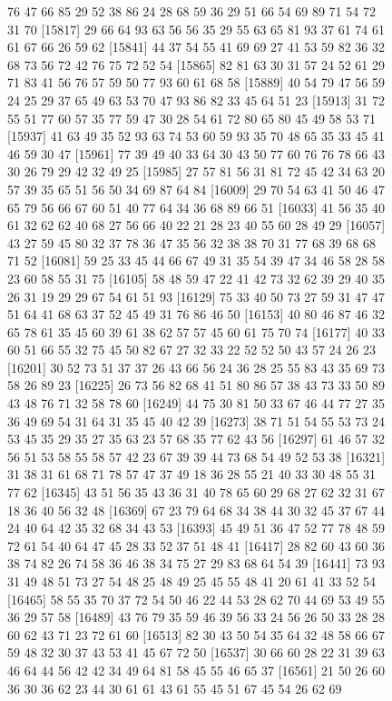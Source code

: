 \documentclass{article}
\begin{document}
\begin{figure}[H]
\begin{Schunk}
\begin{Soutput}
[15793] 76 47 66 85 29 52 38 86 24 28 68 59 36 29 51 66 54 69 89 71 54 72 31 70
[15817] 29 66 64 93 63 56 56 35 29 55 63 65 81 93 37 61 74 61 61 67 66 26 59 62
[15841] 44 37 54 55 41 69 69 27 41 53 59 82 36 32 68 73 56 72 42 76 75 72 52 54
[15865] 82 81 63 30 31 57 24 52 61 29 71 83 41 56 76 57 59 50 77 93 60 61 68 58
[15889] 40 54 79 47 56 59 24 25 29 37 65 49 63 53 70 47 93 86 82 33 45 64 51 23
[15913] 31 72 55 51 77 60 57 35 77 59 47 30 28 54 61 72 80 65 80 45 49 58 53 71
[15937] 41 63 49 35 52 93 63 74 53 60 59 93 35 70 48 65 35 33 45 41 46 59 30 47
[15961] 77 39 49 40 33 64 30 43 50 77 60 76 76 78 66 43 30 26 79 29 42 32 49 25
[15985] 27 57 81 56 31 81 72 45 42 34 63 20 57 39 35 65 51 56 50 34 69 87 64 84
[16009] 29 70 54 63 41 50 46 47 65 79 56 66 67 60 51 40 77 64 34 36 68 89 66 51
[16033] 41 56 35 40 61 32 62 62 40 68 27 56 66 40 22 21 28 23 40 55 60 28 49 29
[16057] 43 27 59 45 80 32 37 78 36 47 35 56 32 38 38 70 31 77 68 39 68 68 71 52
[16081] 59 25 33 45 44 66 67 49 31 35 54 39 47 34 46 58 28 58 23 60 58 55 31 75
[16105] 58 48 59 47 22 41 42 73 32 62 39 29 40 35 26 31 19 29 29 67 54 61 51 93
[16129] 75 33 40 50 73 27 59 31 47 47 51 64 41 68 63 37 52 45 49 31 76 86 46 50
[16153] 40 80 46 87 46 32 65 78 61 35 45 60 39 61 38 62 57 57 45 60 61 75 70 74
[16177] 40 33 60 51 66 55 32 75 45 50 82 67 27 32 33 22 52 52 50 43 57 24 26 23
[16201] 30 52 73 51 37 37 26 43 66 56 24 36 28 25 55 83 43 35 69 73 58 26 89 23
[16225] 26 73 56 82 68 41 51 80 86 57 38 43 73 33 50 89 43 48 76 71 32 58 78 60
[16249] 44 75 30 81 50 33 67 46 44 77 27 35 36 49 69 54 31 64 31 35 45 40 42 39
[16273] 38 71 51 54 55 53 73 24 53 45 35 29 35 27 35 63 23 57 68 35 77 62 43 56
[16297] 61 46 57 32 56 51 53 58 55 58 57 42 23 67 39 39 44 73 68 54 49 52 53 38
[16321] 31 38 31 61 68 71 78 57 47 37 49 18 36 28 55 21 40 33 30 48 55 31 77 62
[16345] 43 51 56 35 43 36 31 40 78 65 60 29 68 27 62 32 31 67 18 36 40 56 32 48
[16369] 67 23 79 64 68 34 38 44 30 32 45 37 67 44 24 40 64 42 35 32 68 34 43 53
[16393] 45 49 51 36 47 52 77 78 48 59 72 61 54 40 64 47 45 28 33 52 37 51 48 41
[16417] 28 82 60 43 60 36 38 74 82 26 74 58 36 46 38 34 75 27 29 83 68 64 54 39
[16441] 73 93 31 49 48 51 73 27 54 48 25 48 49 25 45 55 48 41 20 61 41 33 52 54
[16465] 58 55 35 70 37 72 54 50 46 22 44 53 28 62 70 44 69 53 49 55 36 29 57 58
[16489] 43 76 79 35 59 46 39 56 33 24 56 26 50 33 28 28 60 62 43 71 23 72 61 60
[16513] 82 30 43 50 54 35 64 32 48 58 66 67 59 48 32 30 37 43 53 41 45 67 72 50
[16537] 30 66 60 28 22 31 39 63 46 64 44 56 42 42 34 49 64 81 58 45 55 46 65 37
[16561] 21 50 26 60 36 30 36 62 23 44 30 61 61 43 61 55 45 51 67 45 54 26 62 69

\end{Soutput}
\end{Schunk}
\end{figure}
\end{document}
